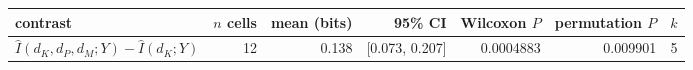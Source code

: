 \begin{tabular}{@{}p{}rrrrrr@{}}
\toprule
\textbf{contrast} & \textbf{$n$ cells} & \textbf{mean (bits)} & \textbf{95\% CI} & \textbf{Wilcoxon $P$} & \textbf{permutation $P$} & \textbf{$k$} \\
\midrule
$\widehat I(d_K,d_P,d_M;Y)-\widehat I(d_K;Y)$ & 12 & 0.138 & [0.073, 0.207] & 0.0004883 & 0.009901 & 5 \\
\bottomrule
\end{tabular}
